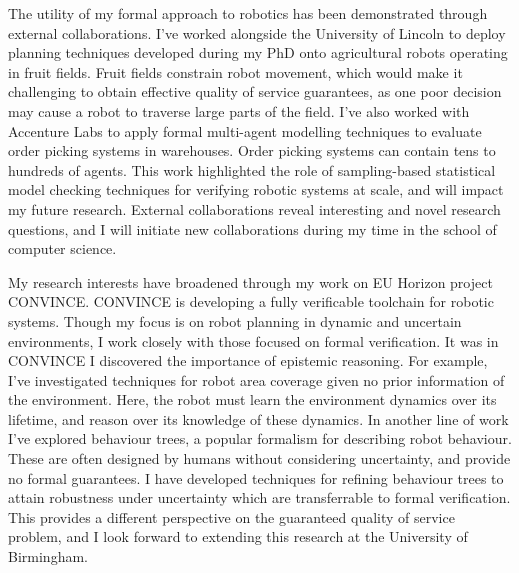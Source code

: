 \documentclass[12pt]{article}
\begin{document}

The utility of my formal approach to robotics has been demonstrated through external collaborations.
%
I've worked alongside the University of Lincoln to deploy planning techniques developed during my PhD onto agricultural robots operating in fruit fields.
%
Fruit fields constrain robot movement, which would make it challenging to obtain effective quality of service guarantees, as one poor decision may cause a robot to traverse large parts of the field.
%
I've also worked with Accenture Labs to apply formal multi-agent modelling techniques to evaluate order picking systems in warehouses.
%
Order picking systems can contain tens to hundreds of agents.
%
This work highlighted the role of sampling-based statistical model checking techniques for verifying robotic systems at scale, and will impact my future research.
%
%
%
External collaborations reveal interesting and novel research questions, and I will initiate new collaborations during my time in the school of computer science.



My research interests have broadened through my work on EU Horizon project CONVINCE.
%
CONVINCE is developing a fully verificable toolchain for robotic systems.
%
Though my focus is on robot planning in dynamic and uncertain environments, I work closely with those focused on formal verification.
%
It was in CONVINCE I discovered the importance of epistemic reasoning.
%
For example, I've investigated techniques for robot area coverage given no prior information of the environment.
%
Here, the robot must learn the environment dynamics over its lifetime, and reason over its knowledge of these dynamics.
%
In another line of work I've explored behaviour trees, a popular formalism for describing robot behaviour.
%
These are often designed by humans without considering uncertainty, and provide no formal guarantees.
%
I have developed techniques for refining behaviour trees to attain robustness under uncertainty which are transferrable to formal verification.
%
This provides a different perspective on the guaranteed quality of service problem, and I look forward to extending this research at the University of Birmingham.
\end{document}
